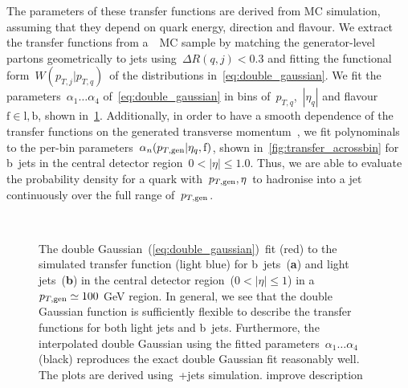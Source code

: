 The parameters of these transfer functions are derived from MC simulation, assuming that they depend on quark energy, direction and flavour. We extract the transfer functions from a~\ttbar~MC sample by matching the generator-level partons geometrically to jets using~$\Delta R(q,j) < 0.3$ and fitting the functional form~$W(p_{T,j}|p_{T,q})$~of the distributions in~\cref{eq:double_gaussian}. We fit the parameters~$\alpha_1 \dots \alpha_4$ of~\cref{eq:double_gaussian} in bins of~$p_{T,q}$,~$|\eta_{q}|$ and flavour~$\mathrm{f}\in{\mathrm{l}, \mathrm{b}}$, shown in~\cref{fig:transfer_perbin}. Additionally, in order to have a smooth dependence of the transfer functions on the generated transverse momentum~\ptgen, we fit polynominals to the per-bin parameters~$\alpha_n(p_{T,\mathrm{gen}}|\eta_{q},\mathrm{f})$, shown in~\cref{fig:transfer_acrossbin} for b~jets in the central detector region~$0 < |\eta| \le 1.0$. Thus, we are able to evaluate the probability density for a quark with~$p_{T,\mathrm{gen}},\eta$ to hadronise into a jet continuously over the full range of~$p_{T,\mathrm{gen}}$.

\begin{figure}
\begin{centering}
 \\
\caption[The double-Gaussian transfer function fit in~\ttbar~simulation.]{The double Gaussian~(\cref{eq:double_gaussian})~fit (red) to the simulated transfer function (light blue) for b~jets~(\textbf{a}) and light jets~(\textbf{b}) in the central detector region~($0 < |\eta| \le 1$) in a~$p_{T,\mathrm{gen}} \simeq 100$ GeV region. In general, we see that the double Gaussian function is sufficiently flexible to describe the transfer functions for both light jets and b~jets. Furthermore, the interpolated double Gaussian using the fitted parameters~$\alpha_1 \dots \alpha_4$ (black) reproduces the exact double Gaussian fit reasonably well. The plots are derived using~\ttbar+jets simulation.
\fixme improve description}
\label{fig:transfer_perbin}
\end{centering}
\end{figure}

